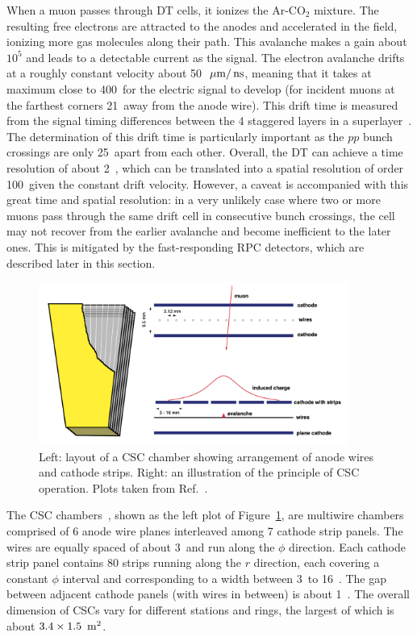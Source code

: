 When a muon passes through DT cells, it ionizes the $\text{Ar-CO}_{2}$ mixture. 
The resulting free electrons are attracted to the anodes and accelerated in the field, ionizing more gas molecules along their path.
This avalanche makes a gain about $10^5$ and leads to a detectable current as the signal.
The electron avalanche drifts at a roughly constant velocity about 50~$\mum/\ns$, 
meaning that it takes at maximum close to 400~\ns for the electric signal to develop 
(for incident muons at the farthest corners 21~\mm away from the anode wire).
This drift time is measured from the signal timing differences between the 4 staggered layers in a superlayer~\cite{ARCE2004441}.
The determination of this drift time is particularly important as the $pp$ bunch crossings are only 25~\ns apart from each other.
Overall, the DT can achieve a time resolution of about 2~\ns,
which can be translated into a spatial resolution of order 100~\mum given the constant drift velocity.
However, a caveat is accompanied with this great time and spatial resolution: 
in a very unlikely case where two or more muons pass through the same drift cell in consecutive bunch crossings,
the cell may not recover from the earlier avalanche and become inefficient to the later ones.
This is mitigated by the fast-responding RPC detectors, which are described later in this section.

\begin{figure}[!htb]
    \centering
    \captionsetup{justification=justified}
    \includegraphics[width=0.90\textwidth]{pics/LHC_CMS/CSC.png}
    \caption{Left: layout of a CSC chamber showing arrangement of anode wires and cathode strips.
             Right: an illustration of the principle of CSC operation.
             Plots taken from Ref.~\cite{collaboration_2013}.}
    \label{fig:cms_csc}
\end{figure}

The CSC chambers~\cite{Collaboration_2008, collaboration_2013}, shown as the left plot of Figure~\ref{fig:cms_csc}, are multiwire chambers comprised of 6 anode wire planes interleaved among 7 cathode strip panels.
The wires are equally spaced of about 3~\mm and run along the $\phi$ direction.  
Each cathode strip panel contains 80 strips running along the $r$ direction, each covering a constant $\phi$ interval and corresponding to a width between 3~\mm to 16~\mm. 
The gap between adjacent cathode panels (with wires in between) is about 1~\cm.  
The overall dimension of CSCs vary for different stations and rings, the largest of which is about $3.4 \times 1.5~\meter^{2}$.

